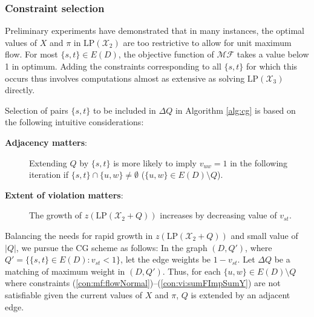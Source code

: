 \subsubsection{Constraint selection}

Preliminary experiments have demonstrated that in many instances, the optimal values of $X$ and $\pi$ in $\text{LP}(\mathcal{X}_2)$ are too restrictive to allow for unit maximum flow.
For most $\{s,t\}\in E(D)$, the objective function of $\mathcal{MF}$ takes a value below 1 in optimum.
Adding the constraints corresponding to all $\{s,t\}$ for which this occurs thus involves computations almost as extensive as solving $\text{LP}(\mathcal{X}_3)$ directly.

Selection of pairs $\{s,t\}$ to be included in $\Delta Q$ in Algorithm \ref{alg:cg} is based on the following intuitive considerations:
\begin{description}
  \item[\textbf{Adjacency matters}:] Extending $Q$ by $\{s,t\}$ is more likely to imply $v_{uw}=1$ in the following iteration if $\{s,t\}\cap\{u,w\}\neq\emptyset$ ($\{u,w\}\in E(D)\setminus Q$).
  \item[\textbf{Extent of violation matters}:] The growth of $z\left(\text{LP}(\mathcal{X}_2+Q)\right)$ increases by decreasing value of $v_{st}$.
\end{description}

Balancing the needs for rapid growth in $z\left(\text{LP}(\mathcal{X}_2+Q)\right)$ and small value of $|Q|$,
we pursue the CG scheme as follows:
In the graph $(D,Q')$, where $Q'=\{\{s,t\}\in E(D):v_{st}<1\}$,
let the edge weights be $1-v_{st}$.
Let $\Delta Q$ be a matching of maximum weight in $(D,Q')$.
Thus, for each $\{u,w\}\in E(D)\setminus Q$ where constraints (\ref{con:mf:flowNormal})--(\ref{con:vi:sumFImpSumY}) are not satisfiable given the current values of $X$ and $\pi$,
$Q$ is extended by an adjacent edge.


